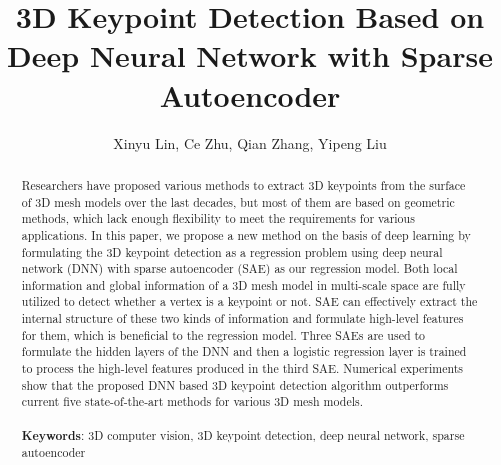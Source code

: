 \documentclass[runningheads]{article}
\begin{document}
	\title{3D Keypoint Detection Based on Deep Neural Network with Sparse Autoencoder} %

	\author{Xinyu Lin, Ce Zhu, Qian Zhang, Yipeng Liu}
	\date{}
	\renewcommand{\thefootnote}{\fnsymbol{footnote}}

	\maketitle

\begin{abstract}
Researchers have proposed various methods to extract 3D keypoints from the surface of 3D mesh models over the last decades, but most of them are based on geometric methods, which lack enough flexibility to meet the requirements for various applications. In this paper, we propose a new method on the basis of deep learning by formulating the 3D keypoint detection as a regression problem using deep neural network (DNN) with sparse autoencoder (SAE) as our regression model. Both local information and global information of a 3D mesh model in multi-scale space are fully utilized to detect whether a vertex is a keypoint or not. SAE can effectively extract the internal structure of these two kinds of information and formulate high-level features for them, which is beneficial to the regression model. Three SAEs are used to formulate the hidden layers of the DNN and then a logistic regression layer is trained to process the high-level features produced in the third SAE. Numerical experiments show that the proposed DNN based 3D keypoint detection algorithm outperforms current five state-of-the-art methods for various 3D mesh models.
\\
\\
\textbf{Keywords}: 3D computer vision, 3D keypoint detection, deep neural network, sparse autoencoder
\end{abstract}
\end{document}
